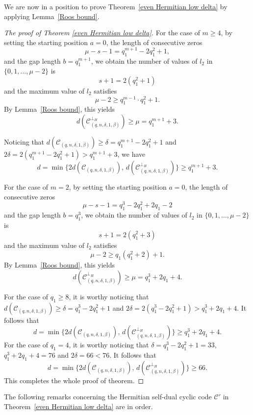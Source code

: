 \documentclass[journal,12pt,onecolumn]{IEEEtran}
\begin{document}
We are now in a position to  prove Theorem~\ref{even Hermitian low delta} by  applying Lemma~\ref{Roos bound}.

\begin{proof}[The proof of Theorem \ref{even Hermitian low delta}]
For the case of $m \ge 4$, by setting the starting position $a = 0$, the length of consecutive zeros
\[
\mu - s - 1 = q_1^{m+1} - 2q_1^2 + 1,
\]
and the gap length $b = q_1^{m+1}$, we obtain the number of values of $l_2$ in $\{0,1,\dots,\mu-2\}$ is
\[
s + 1 = 2(q_1^2 + 1)
\]
and the maximum value of $l_2$ satisfies
\[
\mu - 2 \ge q_1^{m-1} \cdot q_1^2 + 1.
\]
By Lemma~\ref{Roos bound}, this yields
\[
d(\mathcal{C}^{\perp_H}_{(q,n,\delta,1,\beta)}) \ge \mu = q_1^{m+1} + 3.
\]

Noticing that $d(\mathcal{C}_{(q,n,\delta,1,\beta)}) \ge \delta = q_1^{m+1} - 2q_1^2 + 1$ and
\(
2\delta = 2(q_1^{m+1} - 2q_1^2 + 1) > q_1^{m+1} + 3
\), we have
\[
d = \min\{2d(\mathcal{C}_{(q,n,\delta,1,\beta)}),\, d(\mathcal{C}_{(q,n,\delta,1,\beta)}^{\perp_H})\} \ge q_1^{m+1} + 3.
\]

For the case of $m = 2$, by setting the starting position $a = 0$, the length of consecutive zeros
\[
\mu - s - 1 = q_1^3 - 2q_1^2 + 2q_1 - 2
\]
and the gap length $b = q_1^3$, we obtain the number of values of $l_2$ in $\{0,1,\dots,\mu-2\}$ is
\[
s + 1 = 2(q_1^2 + 3)
\]
and the maximum value of $l_2$ satisfies
\[
\mu - 2 \ge q_1(q_1^2 + 2) + 1.
\]
By Lemma~\ref{Roos bound}, this yields
\[
d(\mathcal{C}^{\perp_H}_{(q,n,\delta,1,\beta)}) \ge \mu = q_1^3 + 2q_1 + 4.
\]

For the case of $q_1 \ge 8$, it is worthy noticing that $d(\mathcal{C}_{(q,n,\delta,1,\beta)}) \ge \delta = q_1^3 - 2q_1^2 + 1$ and
\(
2\delta = 2(q_1^3 - 2q_1^2 + 1) > q_1^3 + 2q_1 + 4
\). It follows that
\[
d = \min\{2d(\mathcal{C}_{(q,n,\delta,1,\beta)}),\, d(\mathcal{C}_{(q,n,\delta,1,\beta)}^{\perp_H})\} \ge q_1^3 + 2q_1 + 4.
\]
For the case of $q_1 = 4$, it is worthy noticing that $\delta = q_1^3 - 2q_1^2 + 1 = 33$, $q_1^3 + 2q_1 + 4 = 76$ and $2\delta = 66 < 76$. It follows that
\[
d = \min\{2d(\mathcal{C}_{(q,n,\delta,1,\beta)}),\, d(\mathcal{C}_{(q,n,\delta,1,\beta)}^{\perp_H})\} \ge 66.
\]
This completes the whole proof of theorem.
\end{proof}

The following remarks concerning the Hermitian self-dual cyclic code $\mathcal{C}'$ in Theorem~\ref{even Hermitian low delta} are in order.
\end{document}
